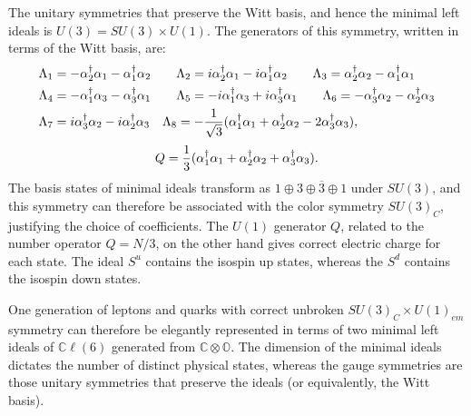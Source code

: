 \documentclass{article}
\newcommand{\bb}[1]{\mathbb{#1}}
\begin{document}
The unitary symmetries that preserve the Witt basis, and hence the minimal left ideals is $U(3)=SU(3)\times U(1)$. The generators of this symmetry, written in terms of the Witt basis, are:
    \begin{align} \notag
     \Lambda_1 &= -\alpha_2^\dagger\alpha_1 - \alpha_1^\dagger\alpha_2 \notag \hspace{2em}
     \Lambda_2 = i\alpha_2^\dagger\alpha_1 -i\alpha_1^\dagger\alpha_2 \notag \hspace{2em}
     \Lambda_3 = \alpha_2^\dagger\alpha_2 - \alpha_1^\dagger\alpha_1 \notag\\ 
     \Lambda_4 &= -\alpha_1^\dagger\alpha_3 - \alpha_3^\dagger\alpha_1 \notag \hspace{2em}
     \Lambda_5 = -i\alpha_1^\dagger\alpha_3 + i\alpha_3^\dagger\alpha_1 \notag \hspace{2em}
     \Lambda_6 = -\alpha_3^\dagger\alpha_2 - \alpha_2^\dagger\alpha_3 \notag\\
     \Lambda_7 &= i\alpha_3^\dagger\alpha_2 - i\alpha_2^\dagger\alpha_3 \notag \hspace{1em}
     \Lambda_8 = -\frac{1}{\sqrt{3}}(\alpha_1^\dagger\alpha_1 + \alpha_2^\dagger\alpha_2 - 2\alpha_3^\dagger\alpha_3), \notag
 \end{align}
     \begin{equation} \notag
     Q = \frac{1}{3}(\alpha_1^\dagger\alpha_1 + \alpha_2^\dagger\alpha_2 + \alpha_3^\dagger\alpha_3).
 \end{equation}
The basis states of minimal ideals transform as $1\oplus 3\oplus\overline{3}\oplus1$ under $SU(3)$, and this symmetry can therefore be associated with the color symmetry $SU(3)_C$, justifying the choice of coefficients. The $U(1)$ generator $Q$, related to the number operator $Q=N/3$, on the other hand gives correct electric charge for each state. The ideal $S^u$ contains the isospin up states, whereas the $S^d$ contains the isospin down states.

One generation of leptons and quarks with correct unbroken $SU(3)_C\times U(1)_{em}$ symmetry can therefore be elegantly represented in terms of two minimal left ideals of $\bb{C}\ell(6)$ generated from $\bb{C}\otimes\bb{O}$. The dimension of the minimal ideals dictates the number of distinct physical states, whereas the gauge symmetries are those unitary symmetries that preserve the ideals (or equivalently, the Witt basis).


\end{document}
